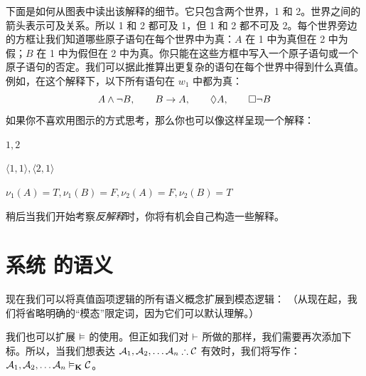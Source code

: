 下面是如何从图表中读出该解释的细节。它只包含两个世界，1 和 2。世界之间的箭头表示可及关系。所以 1 和 2 都可及 1，但 1 和 2 都不可及 2。每个世界旁边的方框让我们知道哪些原子语句在每个世界中为真：$A$ 在 1 中为真但在 2 中为假；$B$ 在 1 中为假但在 2 中为真。你只能在这些方框中写入一个原子语句或一个原子语句的否定。我们可以据此推算出更复杂的语句在每个世界中得到什么真值。例如，在这个解释下，以下所有语句在 $w_1$ 中都为真：
\[
A\wedge\neg B,\qquad B\rightarrow A,\qquad \Diamond A,\qquad \Box\neg B
\]
如果你不喜欢用图示的方式思考，那么你也可以像这样呈现一个解释：

\begin{ekey}
	\item[W]$1,2$
	\item[R]$\langle 1,1\rangle, \langle 2,1\rangle$
	\item[\nu]$\nu_{1}(A)=T, \nu_{1}(B)=F, \nu_{2}(A)=F, \nu_{2}(B)=T$
\end{ekey}

稍后当我们开始考察\emph{反解释}时，你将有机会自己构造一些解释。

\section{系统 \mlK 的语义}
\label{SemanticsK}

现在我们可以将真值函项逻辑的所有语义概念扩展到模态逻辑：
（从现在起，我们将省略明确的“模态”限定词，因为它们可以默认理解。）

我们也可以扩展 $\vDash$ 的使用。但正如我们对 $\vdash$ 所做的那样，我们需要再次添加下标。所以，当我们想表达 $\metav{A}_1,\metav{A}_2, \dots \metav{A}_n\therefore\metav{C}$ 有效时，我们将写作：$\mathcal{A}_1,\mathcal{A}_2, \dots \mathcal{A}_n\vDash_{\mathbf{K}}\mathcal{C}$。

